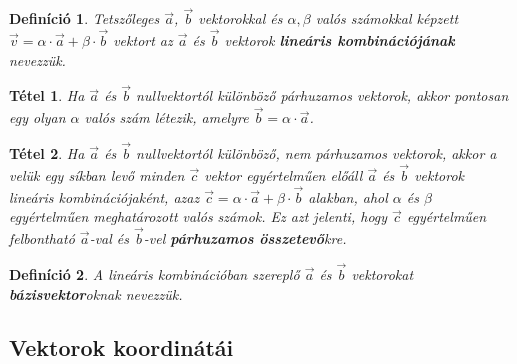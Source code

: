 \documentclass[12pt,a4paper]{article}
\newtheorem{theorem}{Tétel} [section]
\newtheorem{definition}{Definíció} [section]
\begin{document}
\begin{definition}
Tetszőleges $\vec{a}$, $\vec{b}$ vektorokkal és $\alpha, \beta$ valós számokkal képzett $\vec{v}=\alpha\cdot \vec{a} + \beta \cdot \vec{b}$ vektort az $\vec{a}$ és $\vec{b}$ vektorok \textbf{lineáris kombinációjának} nevezzük.
\end{definition}

\begin{theorem}
Ha $\vec{a}$ és $\vec{b}$ nullvektortól különböző párhuzamos vektorok, akkor pontosan egy olyan $\alpha$ valós szám létezik, amelyre $\vec{b}=\alpha\cdot\vec{a}$.
\end{theorem}

\begin{theorem}
Ha $\vec{a}$ és $\vec{b}$ nullvektortól különböző, nem párhuzamos vektorok, akkor a velük egy síkban levő minden $\vec{c}$ vektor egyértelműen előáll $\vec{a}$ és $\vec{b}$ vektorok lineáris kombinációjaként, azaz $\vec{c}=\alpha\cdot \vec{a}+\beta \cdot \vec{b}$ alakban, ahol $\alpha$ és $\beta$ egyértelműen meghatározott valós számok. Ez azt jelenti, hogy $\vec{c}$ egyértelműen felbontható $\vec{a}$-val és $\vec{b}$-vel \textbf{párhuzamos összetevő}kre.
\end{theorem}

\begin{definition}
A lineáris kombinációban szereplő $\vec{a}$ és $\vec{b}$ vektorokat \textbf{bázisvektor}oknak nevezzük.
\end{definition}

\subsection{Vektorok koordinátái}
\end{document}
